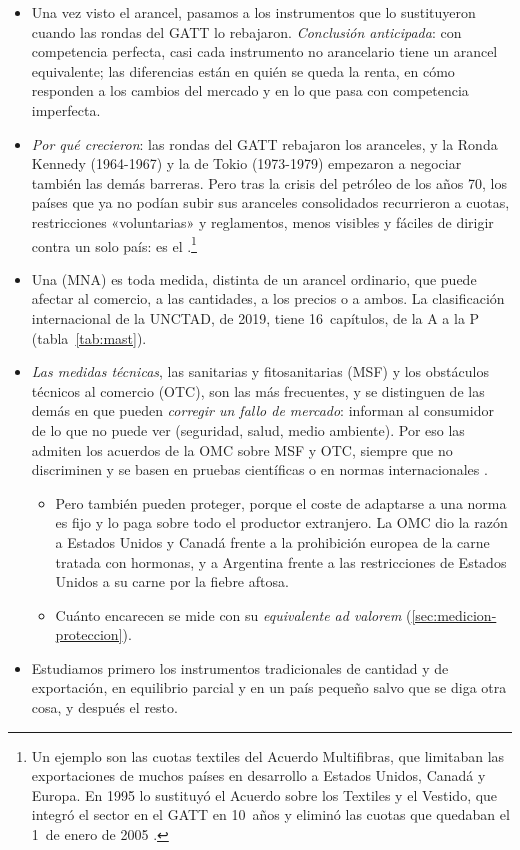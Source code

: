 \documentclass[11pt]{article}
\begin{document}
\begin{itemize}
\item Una vez visto el arancel, pasamos a los instrumentos que lo sustituyeron cuando las rondas del GATT lo rebajaron. \emph{Conclusión anticipada}: con competencia perfecta, casi cada instrumento no arancelario tiene un arancel equivalente; las diferencias están en quién se queda la renta, en cómo responden a los cambios del mercado y en lo que pasa con competencia imperfecta.
\item \emph{Por qué crecieron}: las rondas del GATT rebajaron los aranceles, y la Ronda Kennedy (1964-1967) y la de Tokio (1973-1979) empezaron a negociar también las demás barreras\nocite{OMC2026GATT}. Pero tras la crisis del petróleo de los años 70, los países que ya no podían subir sus aranceles consolidados recurrieron a cuotas, restricciones «voluntarias» y reglamentos, menos visibles y fáciles de dirigir contra un solo país: es el .\footnote{Un ejemplo son las cuotas textiles del Acuerdo Multifibras, que limitaban las exportaciones de muchos países en desarrollo a Estados Unidos, Canadá y Europa. En 1995 lo sustituyó el Acuerdo sobre los Textiles y el Vestido, que integró el sector en el GATT en 10~años y eliminó las cuotas que quedaban el 1~de enero de 2005\nocite{OMC2026Textiles} .}
\item Una  (MNA) es toda medida, distinta de un arancel ordinario, que puede afectar al comercio, a las cantidades, a los precios o a ambos. La clasificación internacional de la UNCTAD, de 2019, tiene 16~capítulos, de la A a la P (tabla~\ref{tab:mast})\nocite{UNCTAD2019ClasificacionMNA}.
\item \emph{Las medidas técnicas}, las sanitarias y fitosanitarias (MSF) y los obstáculos técnicos al comercio (OTC), son las más frecuentes, y se distinguen de las demás en que pueden \emph{corregir un fallo de mercado}: informan al consumidor de lo que no puede ver (seguridad, salud, medio ambiente). Por eso las admiten los acuerdos de la OMC sobre MSF y OTC, siempre que no discriminen y se basen en pruebas científicas o en normas internacionales\nocite{OMC1994MSF,OMC1994OTC} .
  \begin{itemize}
  \item Pero también pueden proteger, porque el coste de adaptarse a una norma es fijo y lo paga sobre todo el productor extranjero. La OMC dio la razón a Estados Unidos y Canadá frente a la prohibición europea de la carne tratada con hormonas\nocite{OMC1998DS26}, y a Argentina frente a las restricciones de Estados Unidos a su carne por la fiebre aftosa\nocite{OMC2015DS447}.
  \item Cuánto encarecen se mide con su \emph{equivalente ad valorem} (\ref{sec:medicion-proteccion}).
  \end{itemize}
\item Estudiamos primero los instrumentos tradicionales de cantidad y de exportación, en equilibrio parcial y en un país pequeño salvo que se diga otra cosa, y después el resto.
\end{itemize}
\end{document}
